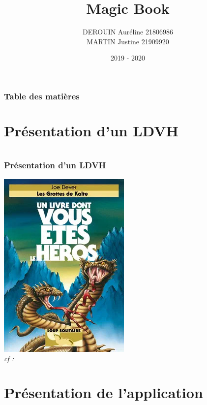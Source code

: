 \documentclass[beamer]{BetterDocument}
\title{Magic Book}
\author{DEROUIN Auréline 21806986\\
	MARTIN Justine 21909920}
\institute{UniCaen}
\date{2019 - 2020}
\begin{document}
	\frame{\titlepage}

	\begin{frame}
		\frametitle{Table des matières}

		\tableofcontents
	\end{frame}

	\section{Présentation d'un LDVH}
	\section{}
	\begin{frame}
		\frametitle{Présentation d'un LDVH}

		\center\includegraphics[height=0.4\paperheight, keepaspectratio]{img/ldvh1.jpg}\\
		\textit{cf : \cite{book:loupSolitaire}}
	\end{frame}

	\section{Présentation de l'application}
\end{document}
